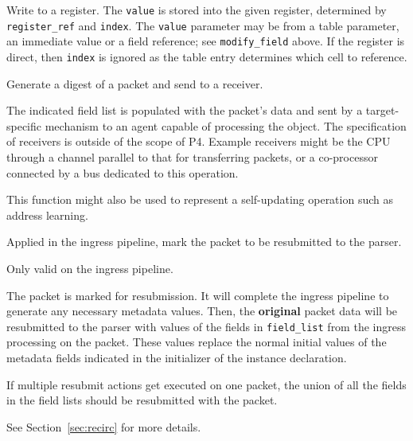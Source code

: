 \documentclass[12pt]{article}
\begin{document}

{ %
Write to a register.
}
{ %
}
{ %
The \texttt{value} is stored into the given register, determined by \texttt{register_ref} and \texttt{index}.
The \texttt{value} parameter 
may be from a table parameter, an immediate value or a field reference; see \texttt{modify_field} above. 
If the register is direct, then \texttt{index} is ignored as the table entry determines which 
cell to reference. 
}


{ %
Generate a digest of a packet and send to a receiver.
}
{ %
}
{ %
The indicated field list is populated with the packet's data and sent by 
a target-specific mechanism to an agent capable of processing the object. 
 The specification of receivers is outside of the scope of P4. Example receivers 
might be the CPU through a channel parallel to that for transferring packets, 
or a co-processor connected by a bus dedicated to this operation. 

This function might also be used to represent a self-updating operation such 
as address learning.
}


{%
Applied in the ingress pipeline, mark the packet to be resubmitted to the 
parser.
}
{ %
}
{ %
Only valid on the ingress pipeline.

The packet is marked for resubmission. It will complete the ingress pipeline 
to generate any necessary metadata values. Then, the \textbf{original} packet data 
will be resubmitted to the parser with values of the fields in \texttt{field_list} from 
the ingress processing on the packet. These values replace the normal initial 
values of the metadata fields indicated in the initializer of the instance 
declaration.

If multiple resubmit actions get executed on one packet, the union of all 
the fields in the field lists should be resubmitted with the packet.

See Section~\ref{sec:recirc} for more details.

}
\end{document}
